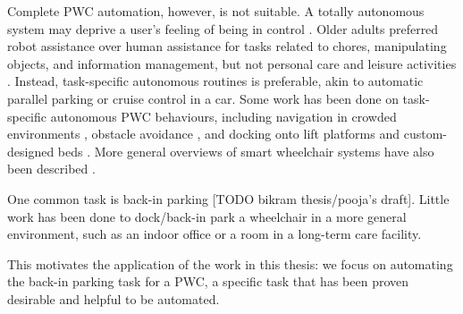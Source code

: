 Complete PWC automation, however, is not suitable. 
A totally autonomous system may deprive a user's feeling of being in control 
\cite{viswanathana2014wizard}.
Older adults preferred robot assistance over human assistance for tasks related
to chores, manipulating objects, and information management, but not personal
care and leisure activities \cite{smarr2014domestic}.
Instead, task-specific autonomous routines is preferable, akin to automatic
parallel parking or cruise control in a car.
Some work has been done on task-specific autonomous PWC behaviours, including
navigation in crowded environments \cite{prassler2001robotics}, obstacle
avoidance \cite{viswanathan2012navigation}, and docking onto lift platforms
\cite{sermeno2006vision} and custom-designed beds \cite{ren2012docking}.
More general overviews of smart wheelchair systems have also been described
\cite{viswanathan2012navigation, simpson2005smart, faria2013patient}. 

One common task is back-in parking [TODO bikram thesis/pooja's draft]. 
Little work has been done to dock/back-in park a wheelchair in a more general
environment, such as an indoor office or a room in a long-term care facility. 

This motivates the application of the work in this thesis:
we focus on automating the back-in parking task for a PWC, a specific task that
has been proven desirable and helpful to be automated.

